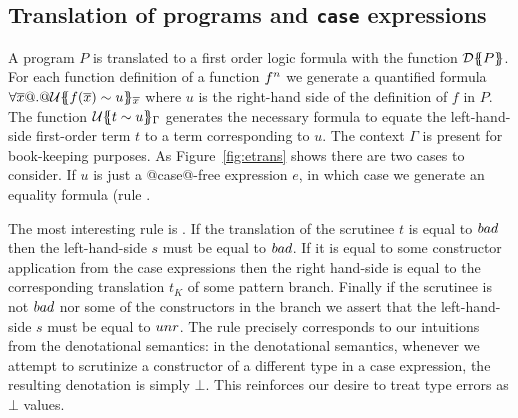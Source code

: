 \subsection{Translation of programs and {\tt case} expressions}
A program $P$ is translated to a first order logic formula with the function 
$\dtrans{}{P}$. For each function definition of a function $f^\ar$ we generate
a quantified formula $\forall \xs @.@ \utrans{}{\ol{x}}{f(\ol{x}) \sim u}$ where $u$ is the 
right-hand side of the definition of $f$ in $P$. The function 
$\utrans{}{\Gamma}{t \sim u}$ generates the necessary formula to equate the left-hand-side
first-order term $t$ to a term corresponding to $u$. The context $\Gamma$ is present
for book-keeping purposes. As Figure~\ref{fig:etrans} shows there are two cases to 
consider. If $u$ is just a @case@-free expression $e$, in which case we generate
an equality formula (rule . 

The most interesting rule is . If the translation of the scrutinee
$t$ is equal to $\bad$ then the left-hand-side $s$ must be equal to $\bad$. If it is 
equal to some constructor application from the case expressions then the right 
hand-side is equal to the corresponding translation $t_K$ of some pattern branch. Finally
if the scrutinee is not $\bad$ nor some of the constructors in the branch we assert that
the left-hand-side $s$ must be equal to $\unr$. The rule precisely corresponds to our 
intuitions from the denotational semantics: in the denotational semantics, whenever
we attempt to scrutinize a constructor of a different type in a case expression, the 
resulting denotation is simply $\bot$. This reinforces our desire to treat type errors
as $\bot$ values. 

